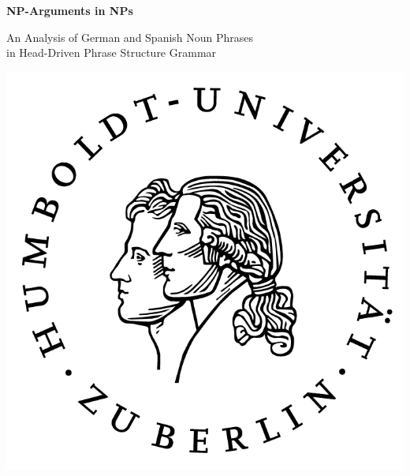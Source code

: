 \thispagestyle{empty}


\vspace{5.6cm}

\begin{center}

\begin{minipage}{.99\textwidth}
	\begin{center}

	\begin{huge}
	\textbf{NP-Arguments in NPs}
	\end{huge}

	\end{center}
\end{minipage}


\vspace{.5cm}

\begin{minipage}{.99\textwidth}
	\begin{center}
	\doublespacing

	\begin{Large}
	An Analysis of German and Spanish Noun Phrases\\
	in Head-Driven Phrase Structure Grammar
	\end{Large}

	\end{center}
\end{minipage}


\vspace{1.4cm}


\begin{minipage}{.99\textwidth}
	\begin{center}

	\includegraphics[scale=1]{graphics/husiegelswgross}


\end{center}
\end{minipage}
\end{center}
